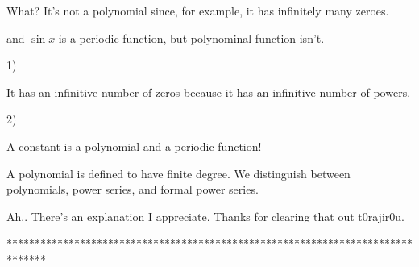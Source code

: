 \begin{solution}
	What? It's not a polynomial since, for example, it has infinitely many zeroes.
\end{solution}



\begin{solution}
	and $ \sin x$ is a periodic function, but polynominal function isn't.
\end{solution}



\begin{solution}
	1)

It has an infinitive number of zeros because it has an infinitive number of powers.

2)

A constant is a polynomial and a periodic function!
\end{solution}



\begin{solution}
	A polynomial is defined to have finite degree.  We distinguish between polynomials, power series, and formal power series.
\end{solution}



\begin{solution}
	Ah..   There's an explanation I appreciate. Thanks for clearing that out t0rajir0u.
\end{solution}
*******************************************************************************
